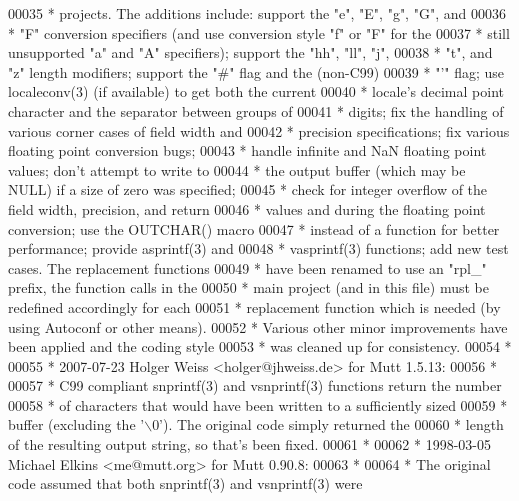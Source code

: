 \begin{DoxyCode}
00035 \textcolor{comment}{ *  projects.  The additions include: support the "e", "E", "g", "G", and}
00036 \textcolor{comment}{ *  "F" conversion specifiers (and use conversion style "f" or "F" for the}
00037 \textcolor{comment}{ *  still unsupported "a" and "A" specifiers); support the "hh", "ll", "j",}
00038 \textcolor{comment}{ *  "t", and "z" length modifiers; support the "#" flag and the (non-C99)}
00039 \textcolor{comment}{ *  "'" flag; use localeconv(3) (if available) to get both the current}
00040 \textcolor{comment}{ *  locale's decimal point character and the separator between groups of}
00041 \textcolor{comment}{ *  digits; fix the handling of various corner cases of field width and}
00042 \textcolor{comment}{ *  precision specifications; fix various floating point conversion bugs;}
00043 \textcolor{comment}{ *  handle infinite and NaN floating point values; don't attempt to write to}
00044 \textcolor{comment}{ *  the output buffer (which may be NULL) if a size of zero was specified;}
00045 \textcolor{comment}{ *  check for integer overflow of the field width, precision, and return}
00046 \textcolor{comment}{ *  values and during the floating point conversion; use the OUTCHAR() macro}
00047 \textcolor{comment}{ *  instead of a function for better performance; provide asprintf(3) and}
00048 \textcolor{comment}{ *  vasprintf(3) functions; add new test cases.  The replacement functions}
00049 \textcolor{comment}{ *  have been renamed to use an "rpl\_" prefix, the function calls in the}
00050 \textcolor{comment}{ *  main project (and in this file) must be redefined accordingly for each}
00051 \textcolor{comment}{ *  replacement function which is needed (by using Autoconf or other means).}
00052 \textcolor{comment}{ *  Various other minor improvements have been applied and the coding style}
00053 \textcolor{comment}{ *  was cleaned up for consistency.}
00054 \textcolor{comment}{ *}
00055 \textcolor{comment}{ * 2007-07-23 Holger Weiss <holger@jhweiss.de> for Mutt 1.5.13:}
00056 \textcolor{comment}{ *}
00057 \textcolor{comment}{ *  C99 compliant snprintf(3) and vsnprintf(3) functions return the number}
00058 \textcolor{comment}{ *  of characters that would have been written to a sufficiently sized}
00059 \textcolor{comment}{ *  buffer (excluding the '\(\backslash\)0').  The original code simply returned the}
00060 \textcolor{comment}{ *  length of the resulting output string, so that's been fixed.}
00061 \textcolor{comment}{ *}
00062 \textcolor{comment}{ * 1998-03-05 Michael Elkins <me@mutt.org> for Mutt 0.90.8:}
00063 \textcolor{comment}{ *}
00064 \textcolor{comment}{ *  The original code assumed that both snprintf(3) and vsnprintf(3) were}

\end{DoxyCode}
